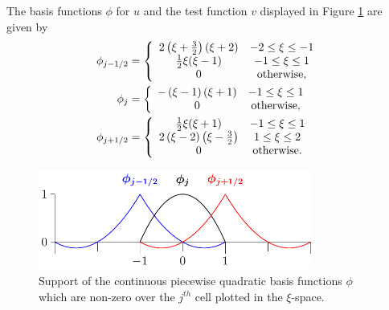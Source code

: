 The basis functions $\phi$ for $u$ and the test function $v$ displayed in Figure \ref{fig:P2ContBasisAPP} are given by
\begin{subequations}
	\label{eqn:App1:PhiDef}
\begin{align}
\phi_{j-1/2} &= \left\lbrace \begin{array}{c c}
2 \left(\xi + \frac{3}{2}\right)\left(\xi + 2\right) & -2 \le \xi \le -1\\
\frac{1}{2}\xi(\xi - 1) & -1 \le \xi \le 1\\
0 & \text{otherwise} ,\end{array} \right.  \\
\phi_{j} &= \left\lbrace \begin{array}{c c}
-\left(\xi - 1\right)\left(\xi + 1\right) & -1 \le \xi \le 1\\
0 & \text{otherwise},
\end{array} \right.  \\ 
\phi_{j+1/2} &= \left\lbrace \begin{array}{c c}
\frac{1}{2}\xi(\xi + 1) & -1 \le \xi \le 1\\
2\left(\xi - 2\right)\left(\xi - \frac{3}{2} \right) & 1 \le \xi \le 2\\
0 & \text{otherwise}.
\end{array} \right. 
\end{align}
\end{subequations}
\begin{figure}
	\centering
	\includegraphics[width=0.8\textwidth]{./app1/Figures/P2.pdf}
	\caption{Support of the continuous piecewise quadratic basis functions $\phi$ which are non-zero over the $j^{th}$ cell plotted in the $\xi$-space.}
	\label{fig:P2ContBasisAPP}
\end{figure}

